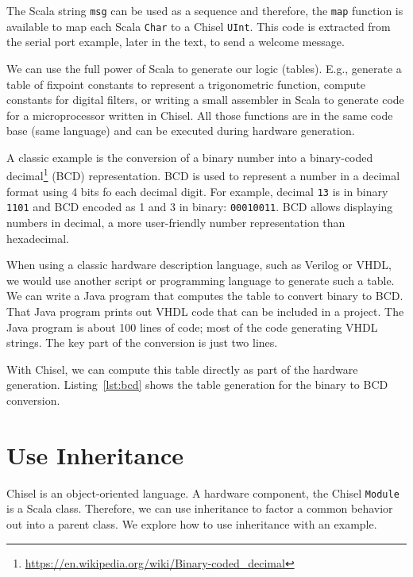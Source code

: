 \documentclass[%
    10pt,
    headinclude, footexclude,
    openright, %
    notitlepage,
    cleardoubleempty,
    headsepline,
    pointlessnumbers,
    bibtotoc, idxtotoc,
    ]{scrbook}
\newcommand{\code}[1]{{\small{\texttt{#1}}}}
\newcommand{\myref}[2]{\href{#1}{#2}}
\renewcommand{\myref}[2]{{#2}{\footnote{\url{#1}}}}
\begin{document}

\noindent The Scala string \code{msg} can be used as a sequence and therefore, the \code{map}
function is available to map each Scala \code{Char} to a Chisel \code{UInt}.
This code is extracted from the serial port example, later in the text, to send a welcome
message. 


We can use the full power of Scala to generate our logic (tables).
E.g., generate a table of fixpoint constants to represent a trigonometric function,
compute constants for digital filters, or writing a small assembler in Scala
to generate code for a microprocessor written in Chisel. All those functions
are in the same code base (same language) and can be executed during
hardware generation.

A classic example is the conversion of a binary number
into a \myref{https://en.wikipedia.org/wiki/Binary-coded_decimal}{binary-coded decimal}
(BCD) representation. BCD is used to represent a number in a decimal
format using 4 bits fo each decimal digit. For example, decimal \code{13} is in binary
\code{1101} and BCD encoded as 1 and 3 in binary: \code{00010011}.
BCD allows displaying numbers in decimal, a more user-friendly number
representation than hexadecimal.

When using a classic hardware description language, such as Verilog or VHDL,
we would use another script or programming language to generate such a table.
We can write a Java program that computes the table to convert binary to BCD.
That Java program prints out VHDL code that can be included in a project.
The Java program is about 100 lines of code; most of the code generating
VHDL strings. The key part of the conversion is just two lines.

With Chisel, we can compute this table directly as part of the hardware generation.
Listing~\ref{lst:bcd} shows the table generation for the binary to BCD conversion.


\section{Use Inheritance}
\label{sec:inheritance}


Chisel is an object-oriented language. A hardware component, the Chisel \code{Module}
is a Scala class. Therefore, we can use inheritance to factor a common behavior
out into a parent class. We explore how to use inheritance with an example.
\end{document}
